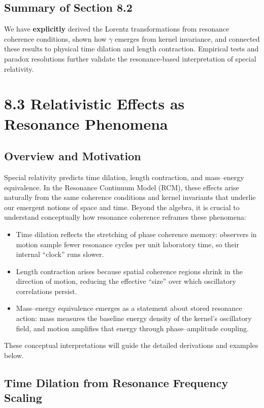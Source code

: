 \subsection{Summary of Section 8.2}
We have \textbf{explicitly} derived the Lorentz transformations from resonance coherence conditions, shown how \(\gamma\) emerges from kernel invariance, and connected these results to physical time dilation and length contraction.  Empirical tests and paradox resolutions further validate the resonance-based interpretation of special relativity.

\section{8.3 Relativistic Effects as Resonance Phenomena}

\subsection{Overview and Motivation}

Special relativity predicts time dilation, length contraction, and mass–energy equivalence. In the Resonance Continuum Model (RCM), these effects arise naturally from the same coherence conditions and kernel invariants that underlie our emergent notions of space and time. Beyond the algebra, it is crucial to understand conceptually how resonance coherence reframes these phenomena:

\begin{itemize}
  \item Time dilation reflects the stretching of phase coherence memory: observers in motion sample fewer resonance cycles per unit laboratory time, so their internal “clock” runs slower.
  \item Length contraction arises because spatial coherence regions shrink in the direction of motion, reducing the effective “size” over which oscillatory correlations persist.
  \item Mass–energy equivalence emerges as a statement about stored resonance action: mass measures the baseline energy density of the kernel’s oscillatory field, and motion amplifies that energy through phase–amplitude coupling.
\end{itemize}

These conceptual interpretations will guide the detailed derivations and examples below.

\subsection{Time Dilation from Resonance Frequency Scaling}

